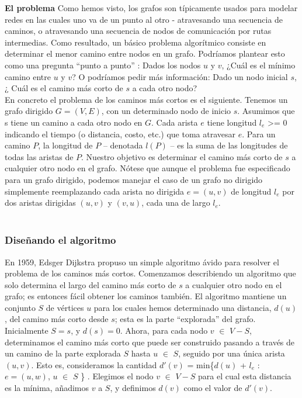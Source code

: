 \documentclass[a4paper, 12pt]{book}
\begin{document}
\textbf{El problema}
Como hemos visto, los grafos son típicamente usados para modelar redes en las cuales uno va de un punto al otro -  atravesando una secuencia de caminos, o atravesando una secuencia de nodos de comunicación por rutas intermedias. Como resultado, un básico problema algorítmico consiste en determinar el menor camino entre nodos en un grafo. Podríamos plantear esto como una pregunta ``punto a punto'' : Dados los nodos $u$ y $v$, ¿Cuál es el mínimo camino entre $u$ y $v$? O podríamos pedir más información: Dado un nodo inicial $s$, ¿ Cuál es el camino más corto de $s$ a cada otro nodo?\\

En concreto el problema de los caminos más cortos es el siguiente. Tenemos un grafo dirigido $G=(V,E)$, con un determinado nodo de inicio $s$. Asumimos que s tiene un camino a cada otro nodo en $G$. Cada arista $e$ tiene longitud $l_e$ >=  0 indicando el tiempo (o distancia, costo, etc.) que toma atravesar $e$. Para un camino $P$, la longitud de $P$ – denotada $l(P)$ – es la suma de las longitudes de todas las aristas de $P$. Nuestro objetivo es determinar el camino más corto de $s$ a cualquier otro nodo en el grafo. Nótese que aunque el problema fue especificado para un grafo dirigido, podemos manejar el caso de un grafo no dirigido simplemente reemplazando cada arista no dirigida $e=(u,v)$ de longitud $l_e$ por dos aristas dirigidas $(u,v)$ y $(v,u)$, cada una de largo $l_e$.\\\\

\subsubsection*{Diseñando el algoritmo}
En 1959, Edsger Dijkstra propuso un simple algoritmo ávido para resolver el problema de los caminos más cortos. Comenzamos describiendo un algoritmo que solo determina el largo del camino más corto de $s$ a cualquier otro nodo en el grafo; es entonces fácil obtener los caminos también. El algoritmo mantiene un conjunto $S$ de vértices $u$ para los cuales hemos determinado una distancia, $d(u)$, del camino más corto desde $s$; esta es la parte ``explorada'' del grafo. Inicialmente $S={s}$, y $d(s)=0$. Ahora, para cada nodo $v$ \(\in\) $V-S$, determinamos el camino más corto que puede ser construido pasando a través de un camino de la parte explorada $S$ hasta $u$ \(\in\) $S$, seguido por una única arista $(u,v)$. Esto es, consideramos la cantidad $d'(v)$ = min\{$d (u)$ + $l_e$ : $e=(u,w)$, $u$ \(\in\) $S$ \} . Elegimos el nodo $v$ \(\in\) $V-S$ para el cual esta distancia es la mínima, añadimos $v$ a $S$, y definimos $d(v)$ como el valor de $d'(v)$.\\
\end{document}
